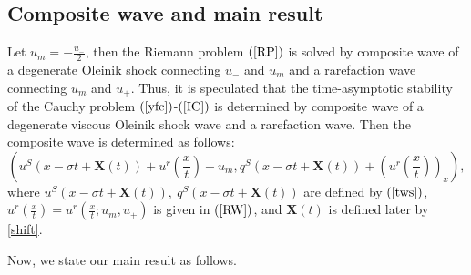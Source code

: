 \documentclass[10pt,reqno]{amsart}
\numberwithin{equation}{section}
\begin{document}
	\subsection{Composite wave and main result}
	Let $u_{m}=-\frac{u_{-}}{2}$, then the Riemann problem $(\ref{RP})$ is solved by composite wave of a degenerate Oleinik shock connecting $u_-$ and $u_m$ and a rarefaction wave connecting $u_m$ and $u_+$. Thus, it is speculated that the time-asymptotic stability of the Cauchy problem $(\ref{yfc})$-$(\ref{IC})$ is determined by composite wave of a degenerate viscous Oleinik
	shock wave and a rarefaction wave. Then the composite wave is determined as follows:
	\begin{equation}\label{CW}
		\left(u^S\left(x-\sigma t+\mathbf{X}(t)\right)+u^r\left(\frac{x}{t} \right)-u_m, q^{S}(x-\sigma t+\mathbf{X}(t))+\left(u^{r}\left(\frac{x}{t}\right)\right)_{x}\right),
	\end{equation}
	where $u^S\left(x-\sigma t+\mathbf{X}(t)\right),\ q^S(x-\sigma t+\mathbf{X}(t))$ are defined by $(\ref{tws})$, $u^r\left(\frac{x}{t} \right)=u^r\left(\frac{x}{t} ;u_{m},u_{+}\right)$ is given in $(\ref{RW})$, and $\mathbf{X}(t)$ is defined later by \eqref{shift}.\par
	Now, we state our main result as follows.
\end{document}
